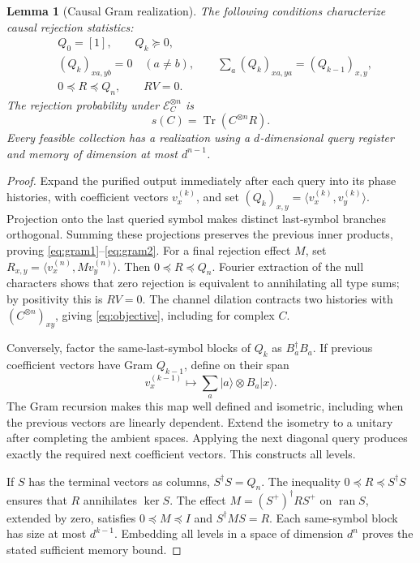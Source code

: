 \documentclass[11pt,a4paper]{article}
\newtheorem{lemma}[theorem]{Lemma}
\theoremstyle{remark}
\DeclareMathOperator{\Tr}{Tr}
\newcommand{\ket}[1]{|#1\rangle}
\newcommand{\ip}[2]{\langle #1,#2\rangle}
\newcommand{\E}{\mathcal E}
\begin{document}
\begin{lemma}[Causal Gram realization]\label{lem:gram}
The following conditions characterize causal rejection statistics:
\begin{align}
 &Q_0=[1],\qquad Q_k\succeq0,\label{eq:gram1}\\
 &(Q_k)_{xa,yb}=0\quad(a\ne b),\qquad
   \sum_a(Q_k)_{xa,ya}=(Q_{k-1})_{x,y},\label{eq:gram2}\\
 &0\preceq R\preceq Q_n,\qquad RV=0.\label{eq:gram3}
\end{align}
The rejection probability under \(\E_C^{\otimes n}\) is
\begin{equation}\label{eq:objective}
 s(C)=\Tr(C^{\otimes n}R).
\end{equation}
Every feasible collection has a realization using a \(d\)-dimensional
query register and memory of dimension at most \(d^{n-1}\).
\end{lemma}
\begin{proof}
Expand the purified output immediately after each query into its
phase histories, with coefficient vectors \(v_x^{(k)}\), and set
\((Q_k)_{x,y}=\ip{v_x^{(k)}}{v_y^{(k)}}\).
Projection onto the last queried symbol makes distinct last-symbol
branches orthogonal. Summing these projections preserves the previous
inner products, proving \eqref{eq:gram1}--\eqref{eq:gram2}.
For a final rejection effect \(M\), set
\(R_{x,y}=\ip{v_x^{(n)}}{M v_y^{(n)}}\).
Then \(0\preceq R\preceq Q_n\). Fourier extraction of the null characters
shows that zero rejection is equivalent to annihilating all type sums;
by positivity this is \(RV=0\).
The channel dilation contracts two histories with
\((C^{\otimes n})_{xy}\), giving \eqref{eq:objective}, including for
complex \(C\).

Conversely, factor the same-last-symbol blocks of \(Q_k\) as
\(B_a^\dagger B_a\). If previous coefficient vectors have Gram
\(Q_{k-1}\), define on their span
\[
 v_x^{(k-1)}\longmapsto \sum_a\ket a\otimes B_a\ket x.
\]
The Gram recursion makes this map well defined and isometric, including
when the previous vectors are linearly dependent. Extend the isometry
to a unitary after completing the ambient spaces. Applying the next
diagonal query produces exactly the required next coefficient vectors.
This constructs all levels.

If \(S\) has the terminal vectors as columns, \(S^\dagger S=Q_n\).
The inequality \(0\preceq R\preceq S^\dagger S\) ensures that \(R\)
annihilates \(\ker S\). The effect
\(M=(S^+)^\dagger R S^+\) on \(\operatorname{ran}S\), extended by zero,
satisfies \(0\preceq M\preceq I\) and \(S^\dagger M S=R\).
Each same-symbol block has size at most \(d^{k-1}\).
Embedding all levels in a space of dimension \(d^n\) proves the stated
sufficient memory bound.
\end{proof}
\end{document}
